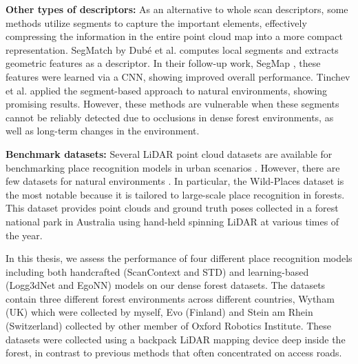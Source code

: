 \noindent \textbf{Other types of descriptors:} \hspace{0.5em} 
As an alternative to whole scan descriptors, some methods utilize segments to capture the important elements, effectively compressing the information in the entire point cloud map into a more compact representation. SegMatch \cite{dube2017icra} by Dubé et al. computes local segments and extracts geometric features as a descriptor. In their follow-up work, SegMap \cite{dube2018rss}, these features were learned via a CNN, showing improved overall performance. Tinchev et al. \cite{tinchev2018iros, tinchev2019ral} applied the segment-based approach to natural environments, showing promising results. However, these methods are vulnerable when these segments cannot be reliably detected due to occlusions in dense forest environments, as well as long-term changes in the environment.
\vspace{8pt}

\noindent \textbf{Benchmark datasets:} \hspace{0.5em} 
Several LiDAR point cloud datasets are available for benchmarking place recognition models in urban scenarios \cite{maddern2017ijrr, behley2019iccv, kim2020icra}. However, there are few datasets for natural environments \cite{triest2022icra, knights2023icra}. In particular, the Wild-Places dataset \cite{knights2023icra} is the most notable because it is tailored to large-scale place recognition in forests. This dataset provides point clouds and ground truth poses collected in a forest national park in Australia using hand-held spinning LiDAR at various times of the year. \vspace{8pt}

\noindent In this thesis, we assess the performance of four different place recognition models including both handcrafted (ScanContext and STD) and learning-based (Logg3dNet and EgoNN) models on our dense forest datasets. The datasets contain three different forest environments across different countries, Wytham (UK) which were collected by myself, Evo (Finland) and Stein am Rhein (Switzerland) collected by other member of Oxford Robotics Institute. These datasets were collected using a backpack LiDAR mapping device deep inside the forest, in contrast to previous methods that often concentrated on access roads. 


